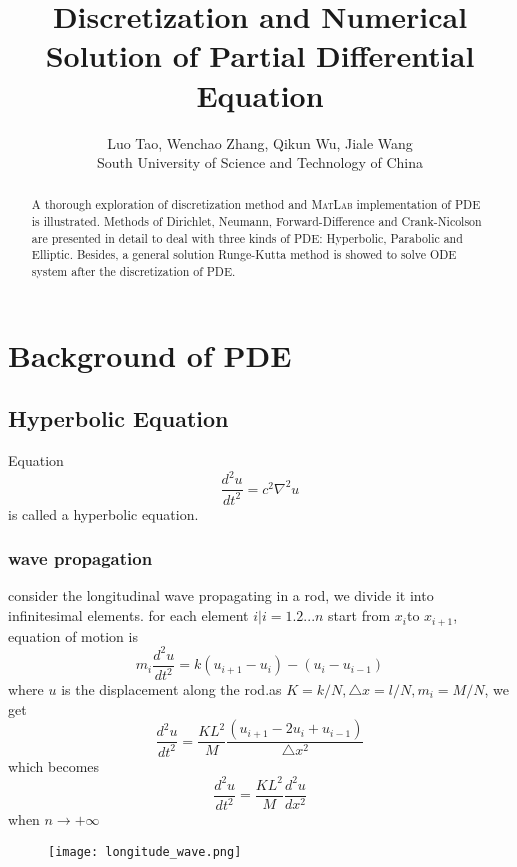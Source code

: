 \documentclass[a4paper]{article}
\title{Discretization and Numerical Solution of Partial Differential Equation}
\author{Luo Tao, Wenchao Zhang, Qikun Wu, Jiale Wang\\
South University of Science and Technology of China\\}
\begin{document}
\maketitle
\tableofcontents
\newpage

\begin{abstract}
A thorough exploration of discretization method and \textsc{MatLab} implementation of PDE is illustrated. Methods of Dirichlet, Neumann, Forward-Difference and Crank-Nicolson are presented in detail to deal with three kinds of PDE: Hyperbolic, Parabolic and Elliptic. Besides, a general solution Runge-Kutta method is showed to solve ODE system after the discretization of PDE.
\end{abstract}

\section{Background of PDE}

\subsection{Hyperbolic Equation}
Equation 
\begin{equation}
\frac{d^{2}u}{dt^{2}}=c^{2}\nabla^{2}u
\end{equation}
 is called a hyperbolic equation.

\subsubsection{wave propagation}
consider the longitudinal wave propagating in a rod, we divide it into infinitesimal elements. for each element $i|i=1.2...n$ start from $x_{i}$to $x_{i+1}$, equation of motion is
\begin{equation}
\unit{m_{i}\frac{d^{2}u}{dt^{2}}=k(u_{i+1}-u_{i})-(u_{i}-u_{i-1})}
\end{equation}
where $u$ is the displacement along the rod.as $K=k/N,\triangle x=l/N,m_{i}=M/N$,
we get 
\[\frac{d^{2}u}{dt^{2}}=\frac{KL^{2}}{M}\frac{(u_{i+1}-2u_{i}+u_{i-1})}{\triangle x^{2}}\]
which becomes 
\begin{equation}
\frac{d^{2}u}{dt^{2}}=\frac{KL^{2}}{M}\frac{d^{2}u}{dx^{2}}
\end{equation}
when $n\rightarrow+\infty$

\begin{figure}[!htb]
\centering
\texttt{[image: longitude\_wave.png]}
\end{figure}
\end{document}
